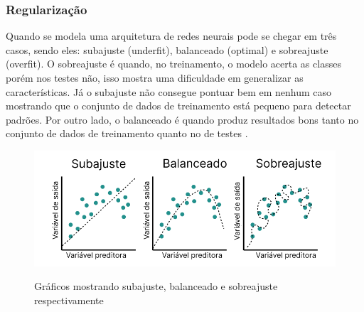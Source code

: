 \subsubsection*{Regularização}

Quando se modela uma arquitetura de redes neurais pode se chegar em três casos, sendo eles: subajuste (underfit), balanceado (optimal) e sobreajuste (overfit). O sobreajuste é quando, no treinamento, o modelo acerta as classes porém nos testes não, isso mostra uma dificuldade em generalizar as características. Já o subajuste não consegue pontuar bem em nenhum caso mostrando que o conjunto de dados de treinamento está pequeno para detectar padrões. Por outro lado,  o balanceado é quando produz resultados bons tanto no conjunto de dados de treinamento quanto no de testes \space\cite{Alzubaidi2021, computation11030052}.

\begin{figure}[ht]
	\caption{Gráficos mostrando subajuste, balanceado e sobreajuste respectivamente}
	\centering %
	\includegraphics[width=15cm]{figures/fittings.png} %
	\label{fig:fittings}
\end{figure}
